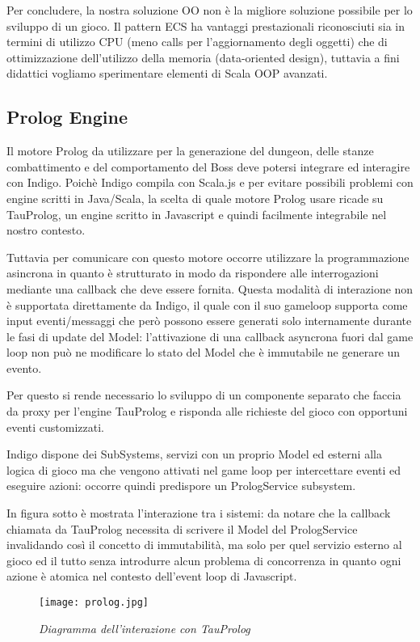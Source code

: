 Per concludere, la nostra soluzione OO non è la migliore soluzione possibile per lo sviluppo di un gioco. Il pattern ECS ha vantaggi prestazionali riconosciuti sia in termini di utilizzo CPU (meno calls per l'aggiornamento degli oggetti) che di ottimizzazione dell'utilizzo della memoria (data-oriented design), tuttavia a fini didattici vogliamo sperimentare elementi di Scala OOP avanzati.

\subsection{Prolog Engine}
Il motore Prolog da utilizzare per la generazione del dungeon, delle stanze combattimento e del comportamento del Boss deve potersi integrare ed interagire con Indigo.
Poichè Indigo compila con Scala.js e per evitare possibili problemi con engine scritti in Java/Scala, la scelta di quale motore Prolog usare ricade su TauProlog, un engine scritto in Javascript e quindi facilmente integrabile nel nostro contesto.

Tuttavia per comunicare con questo motore occorre utilizzare la programmazione asincrona in quanto è strutturato in modo da rispondere alle interrogazioni mediante una callback che deve essere fornita.
Questa modalità di interazione non è supportata direttamente da Indigo, il quale con il suo gameloop supporta come input eventi/messaggi che però possono essere generati solo internamente durante le fasi di update del Model: l'attivazione di una callback asyncrona fuori dal game loop non può ne modificare lo stato del Model che è immutabile ne generare un evento.

Per questo si rende necessario lo sviluppo di un componente separato che faccia da proxy per l'engine TauProlog e risponda alle richieste del gioco con opportuni eventi customizzati.

Indigo dispone dei SubSystems, servizi con un proprio Model ed esterni alla logica di gioco ma che vengono attivati nel game loop per intercettare eventi ed eseguire azioni: occorre quindi predispore un PrologService subsystem.

In figura sotto è mostrata l'interazione tra i sistemi: da notare che la callback chiamata da TauProlog necessita di scrivere il Model del PrologService invalidando così il concetto di immutabilità, ma solo per quel servizio esterno al gioco ed il tutto senza introdurre alcun problema di concorrenza in quanto ogni azione è atomica nel contesto dell'event loop di Javascript.

\begin{figure}[!hbt]
    \centering
    \texttt{[image: prolog.jpg]}
    \caption{\textit{Diagramma dell'interazione con TauProlog}} 
\end{figure}


